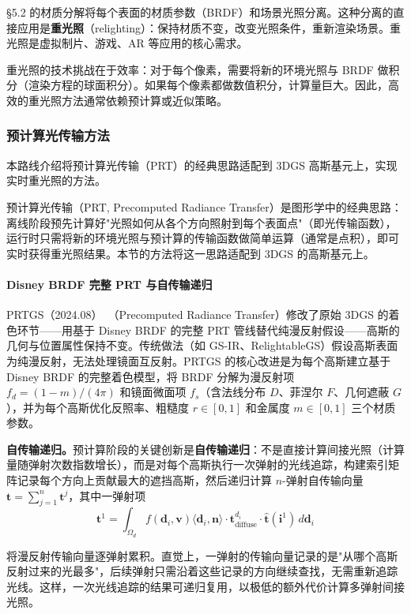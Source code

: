 §5.2 的材质分解将每个表面的材质参数（BRDF）和场景光照分离。这种分离的直接应用是\textbf{重光照}（relighting）：保持材质不变，改变光照条件，重新渲染场景。重光照是虚拟制片、游戏、AR 等应用的核心需求。

重光照的技术挑战在于效率：对于每个像素，需要将新的环境光照与 BRDF 做积分（渲染方程的球面积分）。如果每个像素都做数值积分，计算量巨大。因此，高效的重光照方法通常依赖预计算或近似策略。

\subsubsection{预计算光传输方法}

本路线介绍将预计算光传输（PRT）的经典思路适配到 3DGS 高斯基元上，实现实时重光照的方法。

预计算光传输（PRT, Precomputed Radiance Transfer）是图形学中的经典思路：离线阶段预先计算好"光照如何从各个方向照射到每个表面点"（即光传输函数），运行时只需将新的环境光照与预计算的传输函数做简单运算（通常是点积），即可实时获得重光照结果。本节的方法将这一思路适配到 3DGS 的高斯基元上。

\paragraph{Disney BRDF 完整 PRT 与自传输递归}

PRTGS（2024.08）~\cite{2408_03538}（Precomputed Radiance Transfer）修改了原始 3DGS 的着色环节——用基于 Disney BRDF 的完整 PRT 管线替代纯漫反射假设——高斯的几何与位置属性保持不变。传统做法（如 GS-IR、RelightableGS）假设高斯表面为纯漫反射，无法处理镜面互反射。PRTGS 的核心改进是为每个高斯建立基于 Disney BRDF 的完整着色模型，将 BRDF 分解为漫反射项 $f_d = (1-m)/(4\pi)$ 和镜面微面项 $f_s$（含法线分布 $D$、菲涅尔 $F$、几何遮蔽 $G$），并为每个高斯优化反照率、粗糙度 $r \in [0,1]$ 和金属度 $m \in [0,1]$ 三个材质参数。

\textbf{自传输递归。}预计算阶段的关键创新是\textbf{自传输递归}：不是直接计算间接光照（计算量随弹射次数指数增长），而是对每个高斯执行一次弹射的光线追踪，构建索引矩阵记录每个方向上贡献最大的遮挡高斯，然后递归计算 $n$-弹射自传输向量 $\mathbf{t} = \sum_{j=1}^{n} \mathbf{t}^j$，其中一弹射项
\begin{equation}
\mathbf{t}^1 = \int_{\Omega_d} f(\mathbf{d}_i, \mathbf{v})\langle\mathbf{d}_i, \mathbf{n}\rangle \cdot \mathbf{t}^{d_i}_{\text{diffuse}} \cdot \hat{\mathbf{t}}(\mathbf{i}^{1}) \, d\mathbf{d}_i
\end{equation}

将漫反射传输向量逐弹射累积。直觉上，一弹射的传输向量记录的是"从哪个高斯反射过来的光最多"，后续弹射只需沿着这些记录的方向继续查找，无需重新追踪光线。这样，一次光线追踪的结果可递归复用，以极低的额外代价计算多弹射间接光照。

